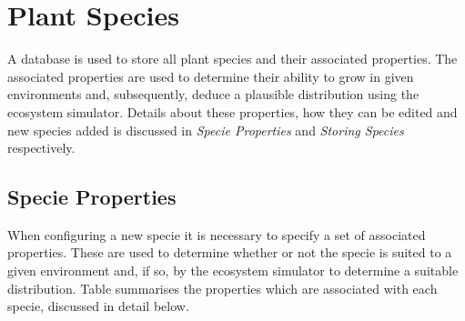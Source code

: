\section{Plant Species}

A database is used to store all plant species and their associated properties. The associated properties are used to determine their ability to grow in given environments and, subsequently, deduce a plausible distribution using the ecosystem simulator. Details about these properties, how they can be edited and new species added is discussed in \textit{Specie Properties} and  \textit{Storing Species} respectively.

\subsection{Specie Properties}

When configuring a new specie it is necessary to specify a set of associated properties. These are used to determine whether or not the specie is suited to a given environment and, if so, by the ecosystem simulator to determine a suitable distribution. Table summarises the properties which are associated with each specie, discussed in detail below.


